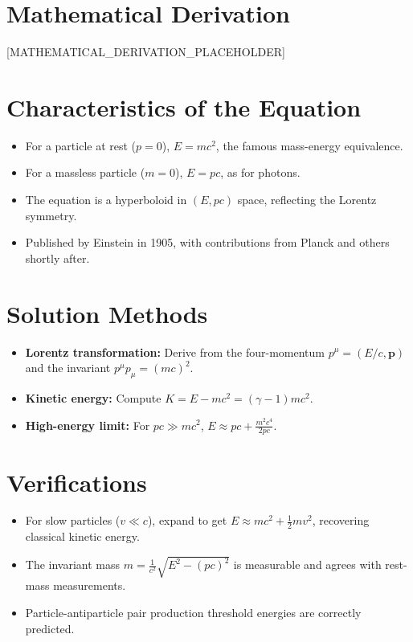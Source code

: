\documentclass[11pt,openright]{book}
\begin{document}
\section*{Mathematical Derivation}

[MATHEMATICAL_DERIVATION_PLACEHOLDER]

\section*{Characteristics of the Equation}

\begin{itemize}
    \item For a particle at rest ($p = 0$), $E = mc^2$, the famous mass-energy equivalence.
    \item For a massless particle ($m = 0$), $E = pc$, as for photons.
    \item The equation is a hyperboloid in $(E, pc)$ space, reflecting the Lorentz symmetry.
    \item Published by Einstein in 1905, with contributions from Planck and others shortly after.
\end{itemize}
\section*{Solution Methods}

\begin{itemize}
    \item \textbf{Lorentz transformation:} Derive from the four-momentum $p^\mu = (E/c, \mathbf{p})$ and the invariant $p^\mu p_\mu = (mc)^2$.
    \item \textbf{Kinetic energy:} Compute $K = E - mc^2 = (\gamma - 1)mc^2$.
    \item \textbf{High-energy limit:} For $pc \gg mc^2$, $E \approx pc + \frac{m^2c^4}{2pc}$.
\end{itemize}
\section*{Verifications}

\begin{itemize}
    \item For slow particles ($v \ll c$), expand to get $E \approx mc^2 + \frac{1}{2}mv^2$, recovering classical kinetic energy.
    \item The invariant mass $m = \frac{1}{c^2}\sqrt{E^2 - (pc)^2}$ is measurable and agrees with rest-mass measurements.
    \item Particle-antiparticle pair production threshold energies are correctly predicted.
\end{itemize}
\end{document}
